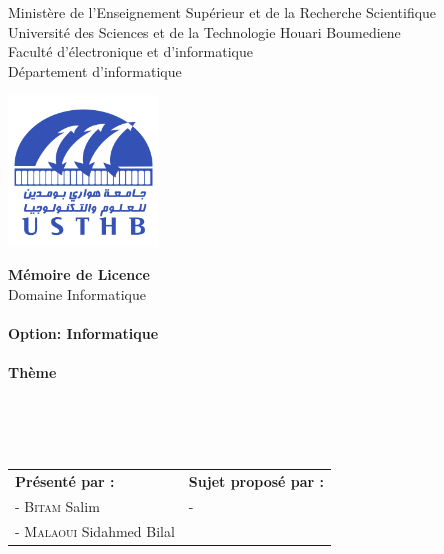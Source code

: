
\begin{center}
    \normalsize{Ministère de l'Enseignement Supérieur et de la Recherche Scientifique}\\
    \normalsize{Université des Sciences et de la Technologie Houari Boumediene}\\
    \normalsize{Faculté d'électronique et d'informatique}\\
    \normalsize{Département d'informatique}\\
    \end{center}
    \begin{center}
    \includegraphics[width=4cm,height=4cm]{images/USTHB_Logo.png}
    \end{center}


    \begin{center}
    \Huge{\textbf{Mémoire de Licence}}\\
    \large{Domaine Informatique}\\
    \textbf{}\\
    \large{\textbf{Option: Informatique}}\\
    \textbf{}\\
    \bigskip
    \normalsize{\textbf{Thème}}
    \end{center}
\\
\\
\\
\begin{table}[h]
    \center
    \begin{tabular}{p{8cm}p{6.5cm}}
    \textbf{Présenté par :} & \textbf{Sujet proposé par :}\\
    - \textsc{Bitam} Salim  & - \\
    - \textsc{Malaoui} Sidahmed Bilal  & \\
    \end{tabular}
\end{table}
\\
\\

